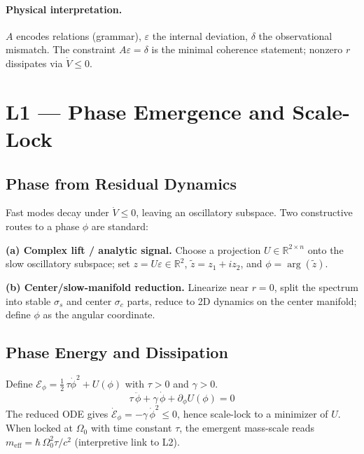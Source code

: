 \documentclass[12pt,a4paper]{article}
\begin{document}
\paragraph{Physical interpretation.}
\(A\) encodes relations (grammar), \(\varepsilon\) the internal deviation, \(\delta\) the observational mismatch.
The constraint \(A\varepsilon=\delta\) is the minimal coherence statement; nonzero \(r\) dissipates via \(\dot V\le0\).

\section{L1 --- Phase Emergence and Scale-Lock}
\subsection{Phase from Residual Dynamics}
Fast modes decay under \(\dot V\le0\), leaving an oscillatory subspace.
Two constructive routes to a phase \(\phi\) are standard:

\textbf{(a) Complex lift / analytic signal.} Choose a projection \(U\in\mathbb{R}^{2\times n}\) onto the slow oscillatory subspace; set \(z=U\varepsilon\in\mathbb{R}^2\), \(\tilde z=z_1+i z_2\), and \(\phi=\arg(\tilde z)\).

\textbf{(b) Center/slow-manifold reduction.} Linearize near \(r=0\), split the spectrum into stable \(\sigma_s\) and center \(\sigma_c\) parts, reduce to 2D dynamics on the center manifold; define \(\phi\) as the angular coordinate.

\subsection{Phase Energy and Dissipation}
Define \(\mathcal{E}_\phi=\tfrac12\,\tau\dot\phi^2+U(\phi)\) with \(\tau>0\) and \(\gamma>0\).
\begin{equation}
\tau\,\ddot\phi+\gamma\,\dot\phi+\partial_\phi U(\phi)=0
\end{equation}
The reduced ODE gives \(\dot{\mathcal{E}}_\phi=-\gamma\,\dot\phi^2\le0\), hence scale-lock to a minimizer of \(U\).
When locked at \(\Omega_0\) with time constant \(\tau\), the emergent mass-scale reads
\(m_{\mathrm{eff}}=\hbar\,\Omega_0^2\tau/c^2\) (interpretive link to L2).
\end{document}
